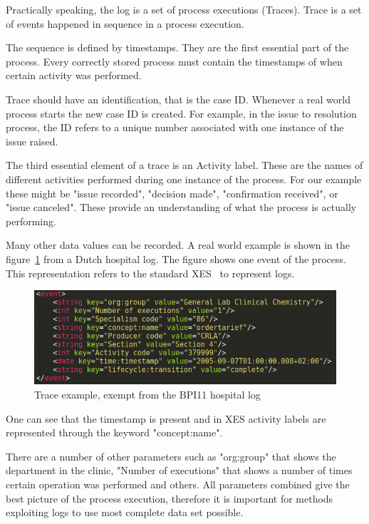 Practically speaking, the log is a set of process executions (Traces). Trace is a set of events happened in sequence in a process execution.

The sequence is defined by timestamps. They are the first essential part of the process. Every correctly stored process must contain the timestamps of when certain activity was performed. 

Trace should have an identification, that is the case ID. Whenever a real world process starts the new case ID is created. For example, in the issue to resolution process, the ID refers to a unique number associated with one instance of the issue raised. 

The third essential element of a trace is an Activity label. These are the names of different activities performed during one instance of the process. For our example these might be "issue recorded", "decision made", "confirmation received", or "issue canceled". These provide an understanding of what the process is actually performing. 

Many other data values can be recorded. A real world example is shown in the figure~\ref{figure:trace-example-1} from a Dutch hospital log. The figure shows one event of the process. This representation refers to the standard XES~\cite{Verbeek2011} to represent logs.


\begin{figure}[!ht]
	\begin{center}  
		\includegraphics[width=\textwidth]{3_event_example.png}
		\caption{Trace example, exempt from the BPI11 hospital log~\cite{bpichallenge2011}}
		\label{figure:trace-example-1}	
	\end{center}
\end{figure}

One can see that the timestamp is present and in XES activity labels are represented through the keyword "concept:name".

There are a number of other parameters such as "org:group" that shows the department in the clinic, "Number of executions" that shows a number of times certain operation was performed and others.  All parameters combined give the best picture of the process execution, therefore it is important for methods exploiting logs to use most complete data set possible.


